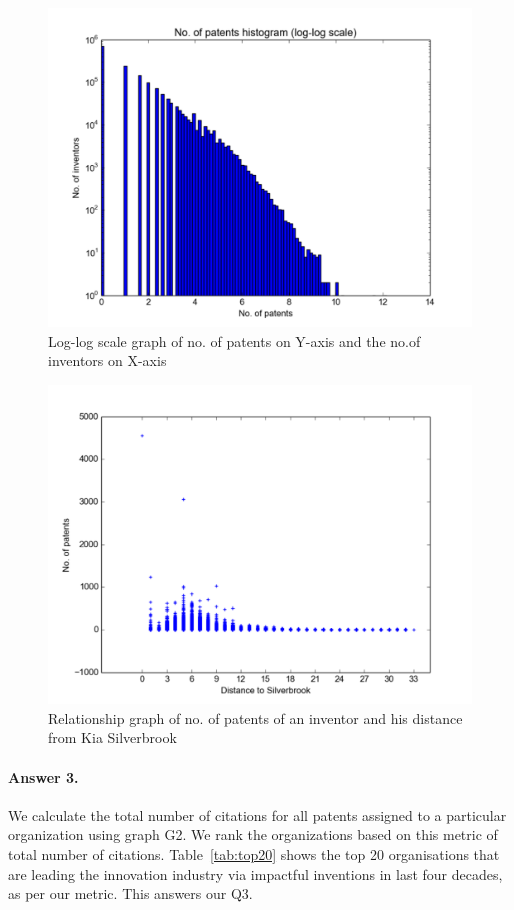 \begin{figure}
  \includegraphics[scale=0.425]{figure/silver_log_log.pdf}
  \caption{ Log-log scale graph of no. of patents on Y-axis and the no.of inventors on X-axis}
\label{fig:patent}	
\end{figure}

\begin{figure}[t]
  \includegraphics[scale=0.425]{figure/distance_patents.pdf}
  \caption{Relationship graph of no. of patents of an inventor and his distance from Kia Silverbrook}
\label{fig:distance_patent}
\end{figure}

\paragraph{Answer 3.}
We calculate the total number of citations for all patents assigned to a particular organization using graph G2. We rank the organizations based on this metric of total number of citations. Table~\ref{tab:top20} shows the top 20 organisations that are leading the innovation industry via impactful inventions in last four decades, as per our metric. 
This answers our Q3. 

